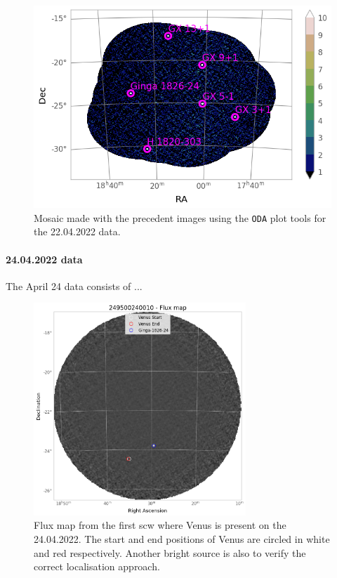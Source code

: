        \begin{figure}[H]
        \centering
        \includegraphics[width = 12cm]{report/Figures/methods/2204/oda_2204.png}
        \caption{Mosaic made with the precedent images using the \texttt{ODA} plot tools for the 22.04.2022 data.}
        \label{22_mosaic}
        \end{figure}
    
    \paragraph{24.04.2022 data}
    The April 24 data consists of ...

        \begin{figure}[H]
        \centering
        \includegraphics[width = 8cm]{report/Figures/methods/2404/24_map.png}
        \caption{Flux map from the first scw where Venus is present on the 24.04.2022. The start and end positions of Venus are circled in white and red respectively. Another bright source is also to verify the correct localisation approach.}
        \label{24_map_single}
        \end{figure}


